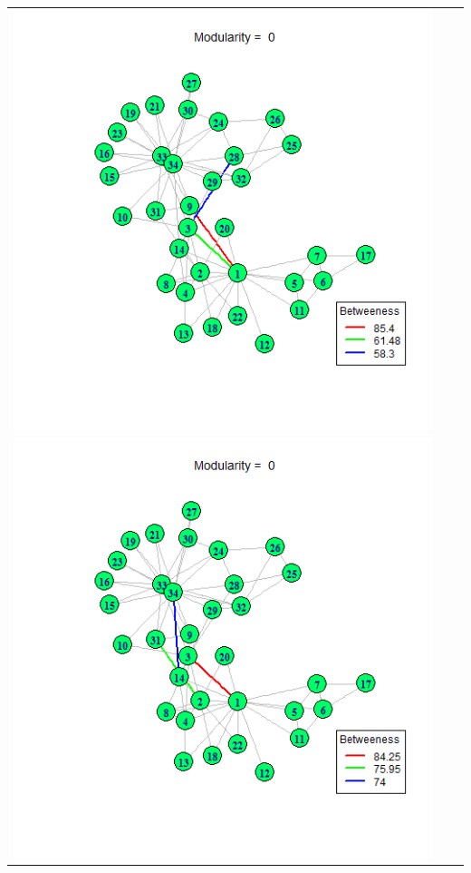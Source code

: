 \documentclass[letterpaper,11pt]{report}
\begin{document}
\begin{savenotes}
\begin{table}[htbp]
\begin{tabular}{ccc}
			\includegraphics[scale=0.25]{karateClub-community-0003.png} \\
			\includegraphics[scale=0.25]{karateClub-community-0004.png} &

\end{tabular}
\end{table}
\end{savenotes}
\end{document}
